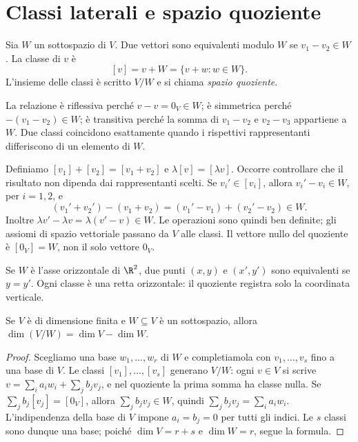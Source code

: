 \section{Classi laterali e spazio quoziente}
\begin{definizione}
Sia $W$ un sottospazio di $V$. Due vettori sono equivalenti modulo
$W$ se $v_1-v_2\in W$. La classe di $v$ è
\[
[v]=v+W=\{v+w:w\in W\}.
\]
L'insieme delle classi è scritto $V/W$ e si chiama
\emph{spazio quoziente}.
\end{definizione}
La relazione è riflessiva perché $v-v=0_V\in W$; è simmetrica perché
$-(v_1-v_2)\in W$; è transitiva perché la somma di
$v_1-v_2$ e $v_2-v_3$ appartiene a $W$. Due classi coincidono
esattamente quando i rispettivi rappresentanti differiscono di un
elemento di $W$.

Definiamo $[v_1]+[v_2]=[v_1+v_2]$ e
$\lambda[v]=[\lambda v]$. Occorre controllare che il risultato non
dipenda dai rappresentanti scelti. Se $v_i'\in[v_i]$, allora
$v_i'-v_i\in W$, per $i=1,2$, e
\[
(v_1'+v_2')-(v_1+v_2)
=(v_1'-v_1)+(v_2'-v_2)\in W.
\]
Inoltre $\lambda v'-\lambda v=\lambda(v'-v)\in W$.
Le operazioni sono quindi ben definite; gli assiomi di spazio
vettoriale passano da $V$ alle classi. Il vettore nullo del
quoziente è $[0_V]=W$, non il solo vettore $0_V$.

\begin{esempio}
Se $W$ è l'asse orizzontale di $\R^2$, due punti $(x,y)$ e
$(x',y')$ sono equivalenti se $y=y'$. Ogni classe è una retta
orizzontale: il quoziente registra solo la coordinata verticale.
\end{esempio}
\begin{schema}
\end{schema}

\begin{teorema}
Se $V$ è di dimensione finita e $W\subseteq V$ è un sottospazio,
allora $\dim(V/W)=\dim V-\dim W$.
\end{teorema}
\begin{proof}
Scegliamo una base $w_1,\ldots,w_r$ di $W$ e completiamola
con $v_1,\ldots,v_s$ fino a una base di $V$. Le classi
$[v_1],\ldots,[v_s]$ generano $V/W$: ogni $v\in V$ si scrive
$v=\sum_i a_iw_i+\sum_j b_jv_j$, e nel quoziente la prima somma
ha classe nulla. Se $\sum_j b_j[v_j]=[0_V]$, allora
$\sum_j b_jv_j\in W$, quindi
$\sum_j b_jv_j=\sum_i a_iw_i$. L'indipendenza della base di $V$
impone $a_i=b_j=0$ per tutti gli indici. Le $s$ classi sono dunque
una base; poiché $\dim V=r+s$ e $\dim W=r$, segue la formula.
\end{proof}
